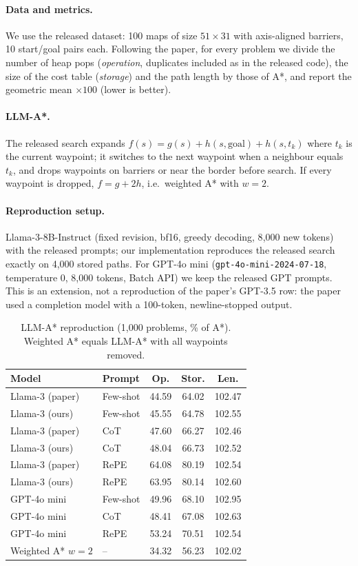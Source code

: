 \documentclass[11pt]{article}
\begin{document}
\paragraph{Data and metrics.}
We use the released dataset: 100 maps of size $51\times31$ with axis-aligned barriers, 10 start/goal pairs each.
Following the paper, for every problem we divide the number of heap pops (\emph{operation}, duplicates included as in the released code), the size of the cost table (\emph{storage}) and the path length by those of A*, and report the geometric mean $\times100$ (lower is better).
\paragraph{LLM-A*.}
The released search expands $f(s)=g(s)+h(s,\text{goal})+h(s,t_k)$ where $t_k$ is the current waypoint; it switches to the next waypoint when a neighbour equals $t_k$, and drops waypoints on barriers or near the border before search.
If every waypoint is dropped, $f=g+2h$, i.e.\ weighted A* with $w{=}2$.
\paragraph{Reproduction setup.}
Llama-3-8B-Instruct (fixed revision, bf16, greedy decoding, 8{,}000 new tokens) with the released prompts; our implementation reproduces the released search exactly on 4{,}000 stored paths.
For GPT-4o mini (\texttt{gpt-4o-mini-2024-07-18}, temperature 0, 8{,}000 tokens, Batch API) we keep the released GPT prompts.
This is an extension, not a reproduction of the paper's GPT-3.5 row: the paper used a completion model with a 100-token, newline-stopped output.

\begin{table}[t]
\centering\small
\setlength{\tabcolsep}{3.5pt}
\begin{tabular}{llccc}
\toprule
Model & Prompt & Op. & Stor. & Len. \\
\midrule
Llama-3 (paper) & Few-shot & 44.59 & 64.02 & 102.47 \\
Llama-3 (ours) & Few-shot & 45.55 & 64.78 & 102.55 \\
Llama-3 (paper) & CoT & 47.60 & 66.27 & 102.46 \\
Llama-3 (ours) & CoT & 48.04 & 66.73 & 102.52 \\
Llama-3 (paper) & RePE & 64.08 & 80.19 & 102.54 \\
Llama-3 (ours) & RePE & 63.95 & 80.14 & 102.60 \\
\midrule
GPT-4o mini & Few-shot & 49.96 & 68.10 & 102.95 \\
GPT-4o mini & CoT & 48.41 & 67.08 & 102.63 \\
GPT-4o mini & RePE & 53.24 & 70.51 & 102.54 \\
\midrule
Weighted A* $w{=}2$ & -- & 34.32 & 56.23 & 102.02 \\
\bottomrule
\end{tabular}
\caption{LLM-A* reproduction (1{,}000 problems, \% of A*). Weighted A* equals LLM-A* with all waypoints removed.}
\label{tab:repro}
\end{table}
\end{document}
